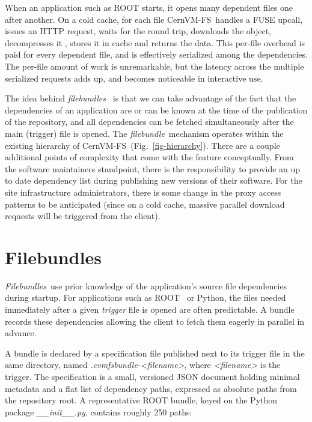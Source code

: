 \documentclass{webofc}
\newcommand{\cvmfs}{CernVM-FS}
\newcommand{\filebundle}{\emph{filebundle}}
\newcommand{\filebundles}{\emph{filebundles}}
\newcommand{\Filebundles}{\emph{Filebundles}}
\begin{document}
When an application such as ROOT starts, it opens many dependent files one after
another. On a cold cache, for each file \cvmfs\ handles a FUSE
upcall, issues an HTTP request, waits for the round trip, downloads the
object, decompresses it , stores it in cache and returns the data. 
This per-file overhead is paid for every dependent file, and is
effectively serialized among the dependencies. 
The per-file amount of work is unremarkable, but the latency across the multiple serialized requests adds up, and becomes noticeable in interactive use.

The idea behind \emph{ \filebundles\ } is that we can take advantage of the fact that the dependencies of an application are or can be known at the time of the publication of the repository, and all dependencies can be fetched simultaneously after the main (trigger) file is opened.
The \filebundle\ mechanism operates within the existing hierarchy of \cvmfs\ (Fig.~\ref{fig-hierarchy}).
There are a couple additional points of complexity that come with the feature conceptually.
From the software maintainers standpoint, there is the responsibility to provide an up to date dependency list during publishing new versions of their software.
For the site infrastructure administrators, there is some change in the proxy access patterns to be anticipated (since on a cold cache, massive parallel download requests will be triggered from the client).

\section{Filebundles}
\label{sec-design}

\Filebundles\ use prior knowledge of the application's source file dependencies during startup. For applications
such as ROOT~\cite{ref-root} or Python, the files needed immediately
after a given \emph{trigger} file is opened are often predictable. A
bundle records these dependencies allowing the client to fetch them eagerly in parallel in advance.

A bundle is declared by a specification file published next to its
trigger file in the same directory, named
\emph{.cvmfsbundle-<filename>}, where \emph{<filename>} is the
trigger. The specification is a small, versioned JSON document holding
minimal metadata and a flat list of dependency paths, expressed as
absolute paths from the repository root. A representative ROOT bundle,
keyed on the Python package \emph{\_\_init\_\_.py}, contains roughly
250 paths:
\end{document}
